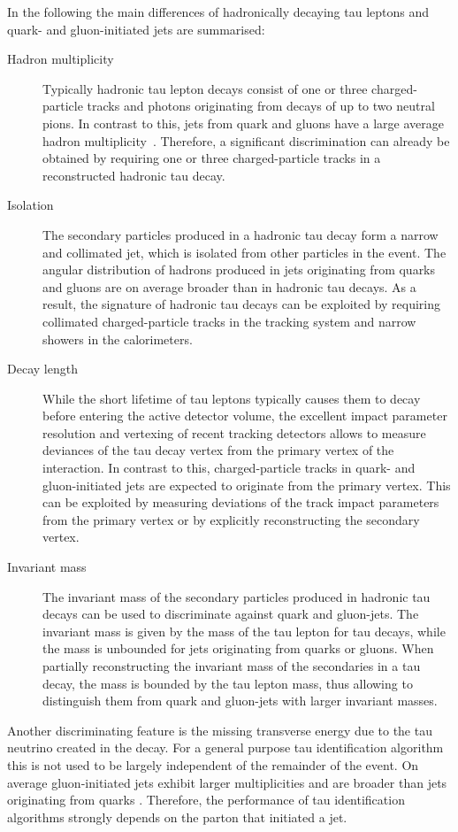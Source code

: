 In the following the main differences of hadronically decaying tau leptons and
quark- and gluon-initiated jets are summarised:
\begin{description}
\item[Hadron multiplicity] Typically hadronic tau lepton decays consist of one
  or three charged-particle tracks and photons originating from decays of up to
  two neutral pions. In contrast to this, jets from quark and gluons have a
  large average hadron multiplicity~\cite{ellis_stirling_webber}. Therefore, a
  significant discrimination can already be obtained by requiring one or three
  charged-particle tracks in a reconstructed hadronic tau decay.

\item[Isolation] The secondary particles produced in a hadronic tau decay form a
  narrow and collimated jet, which is isolated from other particles in the
  event. The angular distribution of hadrons produced in jets originating from
  quarks and gluons are on average broader than in hadronic tau decays. As a
  result, the signature of hadronic tau decays can be exploited by requiring
  collimated charged-particle tracks in the tracking system and narrow showers
  in the calorimeters.

\item[Decay length] While the short lifetime of tau leptons typically causes
  them to decay before entering the active detector volume, the excellent impact
  parameter resolution and vertexing of recent tracking detectors allows to
  measure deviances of the tau decay vertex from the primary vertex of the
  interaction. In contrast to this, charged-particle tracks in quark- and
  gluon-initiated jets are expected to originate from the primary vertex. This
  can be exploited by measuring deviations of the track impact parameters from
  the primary vertex or by explicitly reconstructing the secondary vertex.

\item[Invariant mass] The invariant mass of the secondary particles produced in
  hadronic tau decays can be used to discriminate against quark and gluon-jets.
  The invariant mass is given by the mass of the tau lepton for tau decays,
  while the mass is unbounded for jets originating from quarks or gluons. When
  partially reconstructing the invariant mass of the secondaries in a tau decay,
  the mass is bounded by the tau lepton mass, thus allowing to distinguish them
  from quark and gluon-jets with larger invariant masses.

\end{description}
Another discriminating feature is the missing transverse energy due to the tau
neutrino created in the decay. For a general purpose tau identification
algorithm this is not used to be largely independent of the remainder of the
event. On average gluon-initiated jets exhibit larger multiplicities and are
broader than jets originating from quarks \cite{ellis_stirling_webber}.
Therefore, the performance of tau identification algorithms strongly depends on
the parton that initiated a jet.

